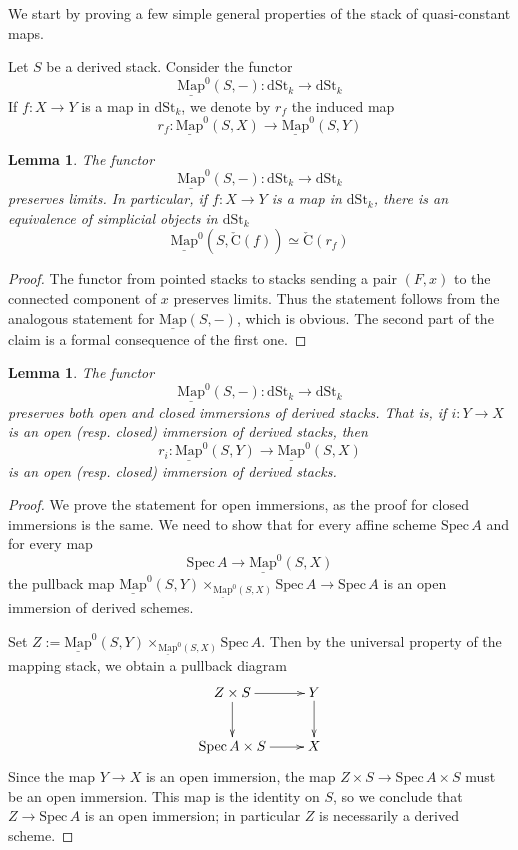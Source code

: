 \documentclass[11pt,letterpaper]{amsart}
\newtheorem{lemma}[dummy]{Lemma}
\newtheorem{remark}[dummy]{Remark}
\newcommand{\Map}[2]{\underline{\mathrm{Map}}\left (#1,#2\right )}
\newcommand{\Mapo}[2]{\underline{\mathrm{Map}}^{0}\left (#1,#2\right )}
\newcommand{\dStk}{\mathrm{dSt}_{k}}
\newcommand{\Spec}{\mathrm{S}\mathrm{pec}\,}
\begin{document}
We start by proving a few simple general properties of the stack of quasi-constant maps.

Let $S$ be a derived stack. Consider the functor 
$$
\Mapo{S}{-}: \dStk \to \dStk
$$ 
If $f:X \to Y$ is a map in $\dStk$, we denote by $r_f$ the induced map
$$
r_f: \Mapo{S}{X} \to \Mapo{S}{Y}
$$
\begin{lemma}\label{remark:Mapolimitpreserving}
The functor  
$$
\Mapo{S}{-}: \dStk \to \dStk
$$  preserves limits. 
In particular, if $f: X \to Y$ is a map in $\dStk$,  there is an equivalence of simplicial objects in $\dStk$
$$
\Mapo{S}{\check{\mathrm{C}}(f)} \simeq  \check{\mathrm{C}}(r_f) 
$$
\end{lemma}
\begin{proof}
The functor from pointed stacks to stacks sending a pair $(F, x)$ to the connected component of $x$ preserves limits. Thus the statement follows from the analogous statement for $\Map{S}{-}$, which is obvious. The second part of the claim is a formal consequence of the first one.
\end{proof}
 
\begin{lemma}
\label{lemma:openinclusion}
The functor  
$$\Mapo{S}{-}: \dStk \to \dStk$$
preserves both open and closed immersions of derived stacks. That is, if $i:Y \to X$ is an open (resp. closed) immersion of derived stacks, then 
$$r_i: \Mapo{S}{Y}\rightarrow\Mapo{S}{X}$$
is an open (resp. closed) immersion of derived stacks.
\end{lemma}
\begin{proof} 
We prove the statement for open immersions, as the proof for closed immersions is the same. 
We need to show that for every affine scheme $\Spec A$ and for every map $$\Spec A\rightarrow\Mapo{S}{X}$$ the pullback map $\Mapo{S}{Y}\times_{\Mapo{S}{X}}\Spec A\rightarrow\Spec A$ is an open  immersion of derived schemes. 

Set $Z := \Mapo{S}{Y}\times_{\Mapo{S}{X}}\Spec A$. Then by the universal property of the mapping stack, we  obtain a pullback diagram 
$$
\xymatrix{
Z\times S \ar[d] \ar[r] & Y \ar[d] \\
\Spec A\times S \ar[r]  & X
}
$$
Since the map $Y\rightarrow X$ is an open immersion, the map $Z\times S \rightarrow \Spec A\times S$ must be an open  immersion. This map is the identity on $S$, so we conclude that $Z\rightarrow \Spec A$ is an open immersion; in particular $Z$ is necessarily a derived scheme. 
\end{proof}
\end{document}
